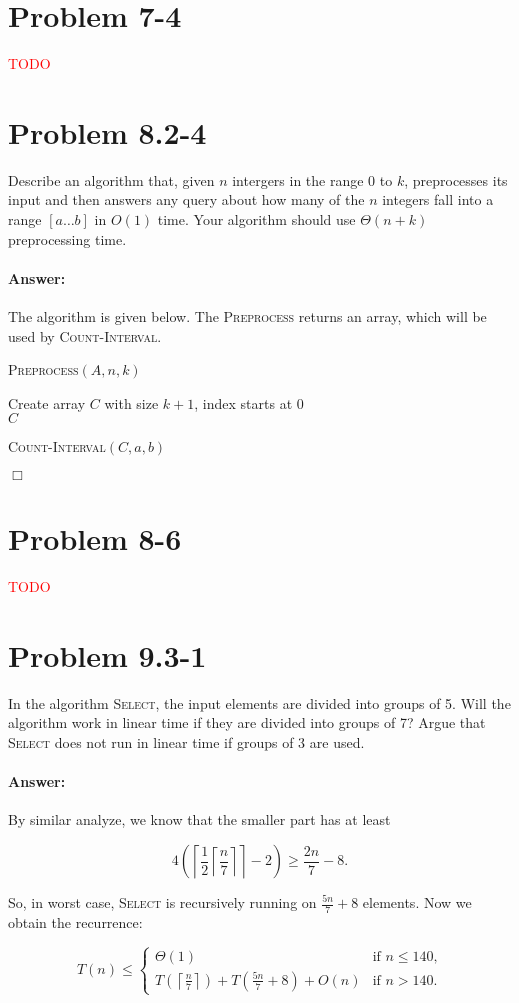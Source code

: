 \documentclass[a4paper,10pt]{article}
\newcommand{\problem}[1]{\section*{Problem #1}}
\newcommand{\answer}{\paragraph{Answer:}}
\newcommand{\qed}{\hfill \ensuremath{\Box}}
\newcommand{\todo}{\textcolor{red}{TODO}{} }
\begin{document}
\problem{7-4}
\todo

\problem{8.2-4}
Describe an algorithm that, given $n$ intergers in the range 0 to $k$, preprocesses its input and then answers
any query about how many of the $n$ integers fall into a range
$[a\ldots b]$ in $O(1)$ time. Your algorithm should use $\Theta(n + k)$ preprocessing time.
\answer

The algorithm is given below. The \textsc{Preprocess} returns an array, which will be used by \textsc{Count-Interval}.

\begin{algorithm}[H]
\caption{\textsc{Preprocess}$(A, n, k)$}
Create array $C$ with size $k + 1$, index starts at $0$\\
\Return $C$
\end{algorithm}

\begin{algorithm}[H]
\caption{\textsc{Count-Interval}$(C, a, b)$}
\end{algorithm}
\qed



\problem{8-6}
\todo



\problem{9.3-1}
In the algorithm \textsc{Select}, the input elements are divided into groups of 5.
Will the algorithm work in linear time if they are divided into groups of 7? Argue that
\textsc{Select} does not run in linear time if groups of 3 are used.
\answer

By similar analyze, we know that the smaller part has at least

$$ 4\left(\left\lceil\frac{1}{2}\left\lceil\frac{n}{7}\right\rceil\right\rceil-2\right)\geq \frac{2n}{7} - 8.$$

So, in worst case, \textsc{Select} is recursively running on $\frac{5n}{7} + 8$ elements. Now we obtain the recurrence:

\begin{equation*}
T(n) \leq \left\{
  \begin{array}{ll}
    \Theta(1)     & \text{if $n \leq 140$,}\\
    T\left(\left\lceil\frac{n}{7}\right\rceil\right) + T\left(\frac{5n}{7} + 8\right) + O(n) & \text{if $n > 140$.}
  \end{array}
\right.
\end{equation*}
\end{document}
